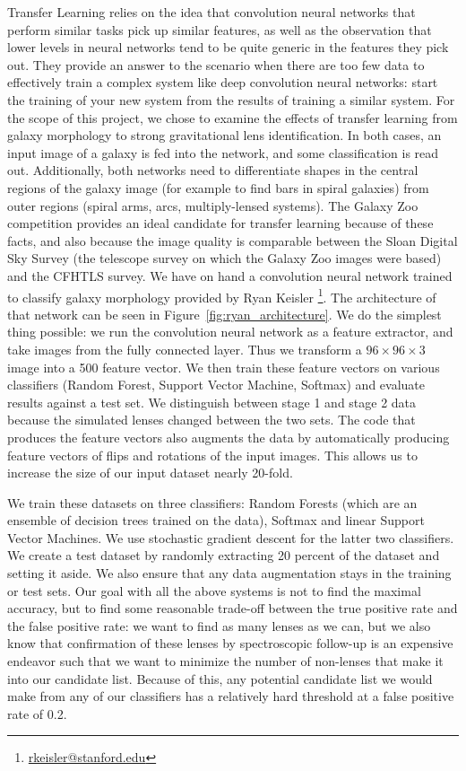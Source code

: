 \documentclass[10pt,twocolumn,letterpaper]{article}
\begin{document}
Transfer Learning relies on the idea that convolution neural networks that
perform similar tasks pick up similar features, as well as the observation that
lower levels in neural networks tend to be quite generic in the features they
pick out. They provide an answer to the scenario when there are too few data to
effectively train a complex system like deep convolution neural networks: start
the training of your new system from the results of training a similar system.
For the scope of this project, we chose to examine the effects of transfer
learning from galaxy morphology to strong gravitational lens identification. In
both cases, an input image of a galaxy is fed into the network, and some
classification is read out. Additionally, both networks need to differentiate
shapes in the central regions of the galaxy image (for example to find bars in
spiral galaxies) from outer regions (spiral arms, arcs, multiply-lensed
systems). The Galaxy Zoo competition provides an ideal candidate for transfer
learning because of these facts, and also because the image quality is
comparable between the Sloan Digital Sky Survey (the telescope survey on which
the Galaxy Zoo images were based) and the CFHTLS survey. We have on hand a
convolution neural network trained to classify galaxy morphology provided by
Ryan Keisler \footnote{\url{rkeisler@stanford.edu}}. The architecture of that
network can be seen in Figure~\ref{fig:ryan_architecture}. We do the simplest
thing possible: we run the convolution neural network as a feature extractor,
and take images from the fully connected layer. Thus we transform a
$96\times96\times3$ image into a 500 feature vector. We then train these
feature vectors on various classifiers (Random Forest, Support Vector Machine,
Softmax) and evaluate results against a test set. We distinguish between stage
1 and stage 2 data because the simulated lenses changed between the two sets.
The code that produces the feature vectors also augments the data by
automatically producing feature vectors of flips and rotations of the input
images. This allows us to increase the size of our input dataset nearly
20-fold.

We train these datasets on three classifiers: Random Forests (which are an
ensemble of decision trees trained on the data), Softmax and linear Support
Vector Machines. We use stochastic gradient descent for the latter two
classifiers. We create a test dataset by randomly extracting 20 percent of the
dataset and setting it aside. We also ensure that any data augmentation stays
in the training or test sets. Our goal with all the above systems is not to
find the maximal accuracy, but to find some reasonable trade-off between the
true positive rate and the false positive rate: we want to find as many lenses
as we can, but we also know that confirmation of these lenses by spectroscopic
follow-up is an expensive endeavor such that we want to minimize the number of
non-lenses that make it into our candidate list. Because of this, any potential
candidate list we would make from any of our classifiers has a relatively hard
threshold at a false positive rate of 0.2.
\end{document}
